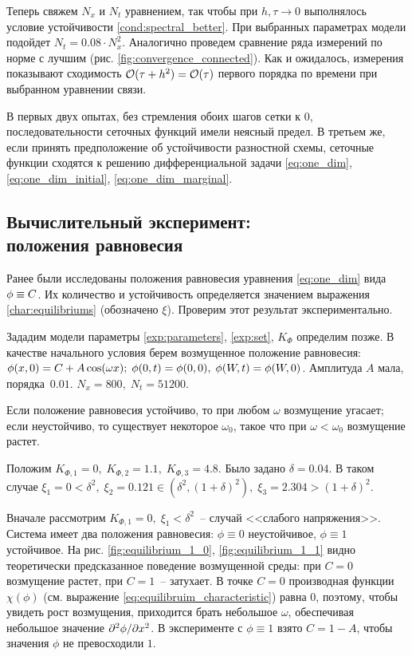 Теперь свяжем $N_x$ и $N_t$ уравнением, так чтобы при $h, \tau \to 0$ выполнялось условие устойчивости \eqref{cond:spectral_better}. При выбранных параметрах модели подойдет $N_t = 0.08 \cdot N_x^2$. Аналогично проведем сравнение ряда измерений по норме с лучшим (рис. \ref{fig:convergence_connected}). Как и ожидалось, измерения показывают сходимость ${\mathcal{O}} (\tau + h^2) = {\mathcal{O}} (\tau)$ первого порядка по времени при выбранном уравнении связи.

В первых двух опытах, без стремления обоих шагов сетки к $0$, последовательности сеточных функций имели неясный предел. В третьем же, если принять предположение об устойчивости разностной схемы, сеточные функции сходятся к решению дифференциальной задачи \eqref{eq:one_dim}, \eqref{eq:one_dim_initial}, \eqref{eq:one_dim_marginal}.


\subsection{Вычислительный эксперимент: \\ положения равновесия}

Ранее были исследованы положения равновесия уравнения \eqref{eq:one_dim} вида $\phi \hm \equiv C$. Их количество и устойчивость определяется значением выражения \eqref{char:equilibriums} (обозначено $\xi$). Проверим этот результат экспериментально.

Зададим модели параметры \eqref{exp:parameters}, \eqref{exp:set}, $K_\Phi$ определим позже. В качестве начального условия берем возмущенное положение равновесия: $\phi(x, 0) = C \hm + A \cos(\omega x); \; \phi(0, t) = \phi(0, 0), \; \phi(W, t) = \phi(W, 0)$. Амплитуда $A$ мала, порядка~$0.01$. $N_x = 800, \; N_t = 51200$.

Если положение равновесия устойчиво, то при любом $\omega$ возмущение угасает; если неустойчиво, то существует некоторое $\omega_0$, такое что при $\omega < \omega_0$ возмущение растет.

Положим $K_{\Phi, 1} = 0, \; K_{\Phi, 2} = 1.1, \; K_{\Phi, 3} = 4.8$. Было задано $\delta = 0.04$. В таком случае $\xi_1 = 0 < \delta^2, \; \xi_2 = 0.121 \in (\delta^2, (1 + \delta)^2), \; \xi_3 = 2.304 > (1 + \delta)^2$.

Вначале рассмотрим $K_{\Phi, 1} = 0, \; \xi_1 < \delta^2$~-- случай <<слабого напряжения>>. Система имеет два положения равновесия: $\phi \equiv 0$ неустойчивое, $\phi \equiv 1$ устойчивое. На рис. \ref{fig:equilibrium_1_0}, \ref{fig:equilibrium_1_1} видно теоретически предсказанное поведение возмущенной среды: при $C = 0$ возмущение растет, при $C = 1$~-- затухает. В точке $C = 0$ производная функции $\chi(\phi)$ (см. выражение \eqref{eq:equilibruim_characteristic}) равна $0$, поэтому, чтобы увидеть рост возмущения, приходится брать небольшое $\omega$, обеспечивая небольшое значение $\partial^2 \phi / \partial x^2$. В эксперименте с $\phi \equiv 1$ взято $C = 1 - A$, чтобы значения $\phi$ не превосходили $1$.

